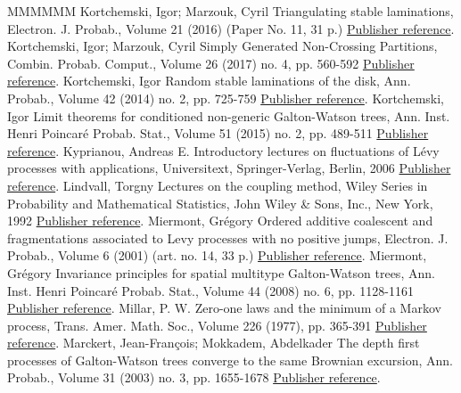 \documentclass[11pt]{article}
\theoremstyle{definition}
\numberwithin{equation}{section}
\numberwithin{figure}{section}
\numberwithin{table}{section}
\begin{document}
\begin{thebibliography}{MMMMMM}
 Kortchemski, Igor; Marzouk, Cyril Triangulating stable laminations, Electron. J. Probab., Volume 21 (2016) (Paper No. 11, 31 p.) \href{https://ahl.centre-mersenne.org/item/AHL_2018__1__149_0/#KM16}{Publisher reference}.
 Kortchemski, Igor; Marzouk, Cyril Simply Generated Non-Crossing Partitions, Combin. Probab. Comput., Volume 26 (2017) no. 4, pp. 560-592 \href{https://ahl.centre-mersenne.org/item/AHL_2018__1__149_0/#KM17}{Publisher reference}.
 Kortchemski, Igor Random stable laminations of the disk, Ann. Probab., Volume 42 (2014) no. 2, pp. 725-759 \href{https://ahl.centre-mersenne.org/item/AHL_2018__1__149_0/#Kor14}{Publisher reference}.
 Kortchemski, Igor Limit theorems for conditioned non-generic Galton-Watson trees, Ann. Inst. Henri Poincaré Probab. Stat., Volume 51 (2015) no. 2, pp. 489-511 \href{https://ahl.centre-mersenne.org/item/AHL_2018__1__149_0/#Kor15}{Publisher reference}.
 Kyprianou, Andreas E. Introductory lectures on fluctuations of Lévy processes with applications, Universitext, Springer-Verlag, Berlin, 2006 \href{https://ahl.centre-mersenne.org/item/AHL_2018__1__149_0/#Kyp06}{Publisher reference}.
 Lindvall, Torgny Lectures on the coupling method, Wiley Series in Probability and Mathematical Statistics, John Wiley \& Sons, Inc., New York, 1992 \href{https://ahl.centre-mersenne.org/item/AHL_2018__1__149_0/#Lin92}{Publisher reference}.
 Miermont, Grégory Ordered additive coalescent and fragmentations associated to Levy processes with no positive jumps, Electron. J. Probab., Volume 6 (2001) (art. no. 14, 33 p.) \href{https://ahl.centre-mersenne.org/item/AHL_2018__1__149_0/#Mie01}{Publisher reference}.
 Miermont, Grégory Invariance principles for spatial multitype Galton-Watson trees, Ann. Inst. Henri Poincaré Probab. Stat., Volume 44 (2008) no. 6, pp. 1128-1161 \href{https://ahl.centre-mersenne.org/item/AHL_2018__1__149_0/#Mie08b}{Publisher reference}.
 Millar, P. W. Zero-one laws and the minimum of a Markov process, Trans. Amer. Math. Soc., Volume 226 (1977), pp. 365-391 \href{https://ahl.centre-mersenne.org/item/AHL_2018__1__149_0/#Mil77}{Publisher reference}.
 Marckert, Jean-François; Mokkadem, Abdelkader The depth first processes of Galton-Watson trees converge to the same Brownian excursion, Ann. Probab., Volume 31 (2003) no. 3, pp. 1655-1678 \href{https://ahl.centre-mersenne.org/item/AHL_2018__1__149_0/#MM03}{Publisher reference}.

\end{thebibliography}
\end{document}
